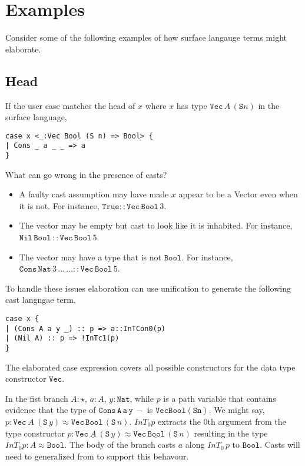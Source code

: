 \section{Examples}

Consider some of the following examples of how surface langauge terms might elaborate.

\subsection{Head}

If the user case matches the head of $x$ where $x$ has type $\mathtt{Vec}\,A\,(\mathtt{S}n)$ in the surface language,

\begin{lstlisting}[basicstyle={\ttfamily\small}]
case x <_:Vec Bool (S n) => Bool> {
| Cons _ a _ _ => a
}
\end{lstlisting}

What can go wrong in the presence of casts?
\begin{itemize}
\item
A faulty cast assumption may have made $x$ appear to be a Vector even when it is not.
For instance, $\mathtt{True}::\mathtt{Vec}\,\mathtt{Bool}\,3$.
\item 
The vector may be empty but cast to look like it is inhabited.
For instance, $\mathtt{Nil}\,\mathtt{Bool}\,::\mathtt{Vec}\,\mathtt{Bool}\,5$.
\item 
The vector may have a type that is not $\mathtt{Bool}$.
For instance, $\mathtt{Cons}\,\mathtt{Nat}\,3\,...\,...::\mathtt{Vec}\,\mathtt{Bool}\,5$.
\end{itemize}

To handle these issues elaboration can use unification to generate the following cast langngae term,

\begin{lstlisting}[basicstyle={\ttfamily\small}]
case x {
| (Cons A a y _) :: p => a::InTCon0(p)
| (Nil A) :: p => !InTc1(p)
}
\end{lstlisting}

The elaborated case expression covers all possible constructors for the data type constructor $\mathtt{Vec}$. 

In the fist branch $A:\star$, $a:A$, $y:\mathtt{Nat}$, while $p$ is a path variable that contains evidence that the type of $\mathtt{Cons\,A\,a\,y\,-}$ is $\mathtt{Vec Bool (S n)}$.
We might say, $p:\mathtt{Vec}\ A\ (\mathtt{S}\,y)\approx\mathtt{Vec}\,\mathtt{Bool}\,(\mathtt{S}\,n)$.
$InT_{0}p$ extracts the 0th argument from the type constructor $p:\mathtt{Vec}\ \underline{A}\ (\mathtt{S}\,y)\approx\mathtt{Vec}\,\underline{\mathtt{Bool}}\,(\mathtt{S}\,n)$ resulting in the type $InT_{0}p:A\approx\mathtt{Bool}$.
The body of the branch casts $a$ along $InT_{0}\,p$ to $\mathtt{Bool}$.
Casts will need to generalized from  to support this behavour.

